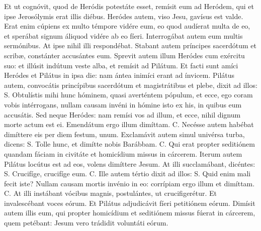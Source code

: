 \begin{paracol}{2}
{Et ut cognóvit, quod de Heródis potestáte esset, remísit eum ad Heródem, qui et ipse Jerosólymis erat illis diébus. Heródes autem, viso Jesu, gavísus est valde. Erat enim cúpiens ex multo témpore vidére eum, eo quod audíerat multa de eo, et sperábat signum áliquod vidére ab eo fíeri. Interrogábat autem eum multis sermónibus. At ipse nihil illi respondébat. Stabant autem príncipes sacerdótum et scribæ, constánter accusántes eum. Sprevit autem illum Heródes cum exércitu suo: et illúsit indútum veste alba, et remísit ad Pilátum. Et facti sunt amíci Heródes et Pilátus in ipsa die: nam ántea inimíci erant ad ínvicem. Pilátus autem, convocátis princípibus sacerdótum et magistrátibus et plebe, dixit ad illos: {\redx S.} Obtulístis mihi hunc hóminem, quasi averténtem pópulum, et ecce, ego coram vobis intérrogans, nullam causam invéni in hómine isto ex his, in quibus eum accusátis. Sed neque Heródes: nam remísi vos ad illum, et ecce, nihil dignum morte actum est ei. Emendátum ergo illum dimíttam. {\redx C.} Necésse autem habébat dimíttere eis per diem festum, unum. Exclamávit autem simul univérsa turba, dicens: {\redx S.} Tolle hunc, et dimítte nobis Barábbam. {\redx C.} Qui erat propter seditiónem quandam fáciam in civitáte et homicídium missus in cárcerem. Iterum autem Pilátus locútus est ad eos, volens dimíttere Jesum. At illi succlamábant, dicéntes: {\redx S.} Crucifíge, crucifíge eum. {\redx C.} Ille autem tértio dixit ad illos: {\redx S.} Quid enim mali fecit iste? Nullam causam mortis invénio in eo: corrípiam ergo illum et dimíttam. {\redx C.} At illi instábant vócibus magnis, postulántes, ut crucifigerétur. Et invalescébant voces eórum. Et Pilátus adjudicávit fíeri petitiónem eórum. Dimísit autem illis eum, qui propter homicídium et seditiónem missus fúerat in cárcerem, quem petébant: Jesum vero trádidit voluntáti eórum.
}\switchcolumn\portugues{
}
\end{paracol}
